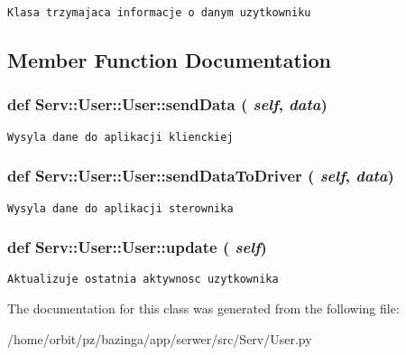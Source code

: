 \footnotesize\begin{verbatim}Klasa trzymajaca informacje o danym uzytkowniku

\end{verbatim}
\normalsize
 

\subsection{Member Function Documentation}
\hypertarget{class_serv_1_1_user_1_1_user_2d0441db55283b641079acb8bf67c30a}{
\subsubsection[{sendData}]{\setlength{\rightskip}{0pt plus 5cm}def Serv::User::User::sendData ( {\em self}, \/   {\em data})}}
\label{class_serv_1_1_user_1_1_user_2d0441db55283b641079acb8bf67c30a}




\footnotesize\begin{verbatim}Wysyla dane do aplikacji klienckiej

\end{verbatim}
\normalsize
 \hypertarget{class_serv_1_1_user_1_1_user_0907f262b618e5b6c05c6e3584e24b44}{
\subsubsection[{sendDataToDriver}]{\setlength{\rightskip}{0pt plus 5cm}def Serv::User::User::sendDataToDriver ( {\em self}, \/   {\em data})}}
\label{class_serv_1_1_user_1_1_user_0907f262b618e5b6c05c6e3584e24b44}




\footnotesize\begin{verbatim}Wysyla dane do aplikacji sterownika

\end{verbatim}
\normalsize
 \hypertarget{class_serv_1_1_user_1_1_user_90697aec786a688ec3308b3ebdcc83a3}{
\subsubsection[{update}]{\setlength{\rightskip}{0pt plus 5cm}def Serv::User::User::update ( {\em self})}}
\label{class_serv_1_1_user_1_1_user_90697aec786a688ec3308b3ebdcc83a3}




\footnotesize\begin{verbatim}Aktualizuje ostatnia aktywnosc uzytkownika

\end{verbatim}
\normalsize
 

The documentation for this class was generated from the following file:\begin{CompactItemize}
\item 
/home/orbit/pz/bazinga/app/serwer/src/Serv/User.py\end{CompactItemize}
